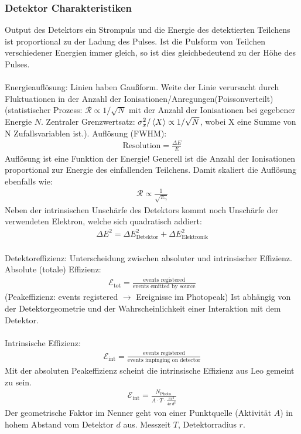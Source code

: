 \documentclass[11pt, a4paper]{article}
\numberwithin{equation}{section}
\begin{document}
\subsubsection{Detektor Charakteristiken}
Output des Detektors ein Strompuls und die Energie des detektierten Teilchens ist proportional zu der Ladung des Pulses.
Ist die Pulsform von Teilchen verschiedener Energien immer gleich, so ist dies gleichbedeutend zu der Höhe des Pulses.\\
\\
Energieauflösung: Linien haben Gaußform. Weite der Linie verursacht durch Fluktuationen in der Anzahl der Ionisationen/Anregungen(Poissonverteilt) (statistischer Prozess: $\mathcal{R} \propto 1 / \sqrt{N}$ mit der Anzahl der Ionisationen bei gegebener Energie $N$. Zentraler Grenzwertsatz: $\sigma_x^2 / \braket{X} \propto 1 / \sqrt{N}$, wobei X eine Summe von N Zufallsvariablen ist.).
Auflösung (FWHM):
\begin{align}
	\text{Resolution} = \frac{\Delta E}{E}
\end{align}
Auflösung ist eine Funktion der Energie! Generell ist die Anzahl der Ionisationen proportional zur Energie des einfallenden Teilchens. Damit skaliert die Auflösung ebenfalls wie:
\begin{align}
	\mathcal{R} \propto \frac{1}{\sqrt{E_\gamma}}
\end{align}
Neben der intrinsischen Unschärfe des Detektors kommt noch Unschärfe der verwendeten Elektron, welche sich quadratisch addiert:
\begin{align}
	\Delta E^2 = \Delta E_\mathrm{Detektor}^2 + \Delta E_\mathrm{Elektronik}^2
\end{align}
\\
Detektoreffizienz: Unterscheidung zwischen absoluter und intrinsischer Effizienz.\\
Absolute (totale) Effizienz:
\begin{align}
	\mathcal{E}_\mathrm{tot} = \frac{\text{events registered}}{\text{events emitted by source}}
\end{align}
(Peakeffizienz: events registered $\rightarrow$ Ereignisse im Photopeak) 
Ist abhängig von der Detektorgeometrie und der Wahrscheinlichkeit einer Interaktion mit dem Detektor.\\
\\
Intrinsische Effizienz:
\begin{align}
	\mathcal{E}_\mathrm{int} = \frac{\text{events registered}}{\text{events impinging on detector}}
\end{align}
Mit der absoluten Peakeffizienz scheint die intrinsische Effizienz aus Leo gemeint zu sein.
\begin{align}
	\label{eq:peakeffizienz}
	\mathcal{E}_\mathrm{int} = \frac{N_\mathrm{Photo.}}{A \cdot T \cdot \frac{\pi r^2}{4\pi \, d^2}}
\end{align}
Der geometrische Faktor im Nenner geht von einer Punktquelle (Aktivität $A$) in hohem Abstand vom Detektor $d$ aus. Messzeit $T$, Detektorradius $r$.
\end{document}
